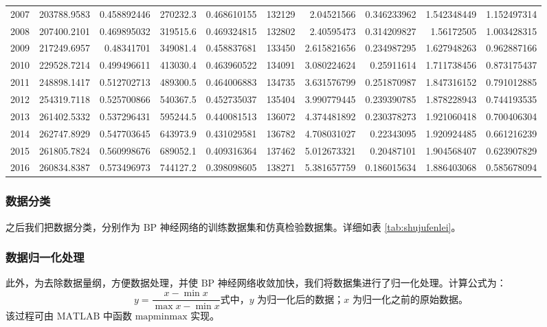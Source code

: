 \begin{table}[hb]
{\begin{tabular}{rrrrrrrrrr}
        2007 & 203788.9583 & 0.458892446 & 270232.3 & 0.468610155 & 132129 & 2.04521566 & 0.346233962 & 1.542348449 & 1.152497314 \\
        2008 & 207400.2101 & 0.469895032 & 319515.6 & 0.469324815 & 132802 & 2.40595473 & 0.314209827 & 1.56172505 & 1.003428315 \\
        2009 & 217249.6957 & 0.48341701 & 349081.4 & 0.458837681 & 133450 & 2.615821656 & 0.234987295 & 1.627948263 & 0.962887166 \\
        2010 & 229528.7214 & 0.499496611 & 413030.4 & 0.463960522 & 134091 & 3.080224624 & 0.25911614 & 1.711738456 & 0.873175437 \\
        2011 & 248898.1417 & 0.512702713 & 489300.5 & 0.464006883 & 134735 & 3.631576799 & 0.251870987 & 1.847316152 & 0.791012885 \\
        2012 & 254319.7118 & 0.525700866 & 540367.5 & 0.452735037 & 135404 & 3.990779445 & 0.239390785 & 1.878228943 & 0.744193535 \\
        2013 & 261402.5332 & 0.537296431 & 595244.5 & 0.440081513 & 136072 & 4.374481892 & 0.230378273 & 1.921060418 & 0.700406304 \\
        2014 & 262747.8929 & 0.547703645 & 643973.9 & 0.431029581 & 136782 & 4.708031027 & 0.22343095 & 1.920924485 & 0.661216239 \\
        2015 & 261805.7824 & 0.560998676 & 689052.1 & 0.409316364 & 137462 & 5.012673321 & 0.20487101 & 1.904568407 & 0.623907829 \\
        2016 & 260834.8387 & 0.573496973 & 744127.2 & 0.398098605 & 138271 & 5.381657759 & 0.186015634 & 1.886403068 & 0.585678094 \\
        \bottomrule[1.5pt]
        \end{tabular}}%
      \label{tab:jutizhi}%
    \end{table}%

  \subsubsection{数据分类}

    之后我们把数据分类，分别作为 $\mathrm{BP}$ 神经网络的训练数据集和仿真检验数据集。详细如表 \ref{tab:shujufenlei}。

  \subsubsection{数据归一化处理}

    \label{ss2:guiyihua}
    此外，为去除数据量纲，方便数据处理，并使 $\mathrm{BP}$ 神经网络收敛加快，我们将数据集进行了归一化处理\cite{liuzhongqi2010}。计算公式为：
    \[
      y = \frac{x-\min{x}}{\max{x}-\min{x}} \text{式中，$y$ 为归一化后的数据；$x$ 为归一化之前的原始数据。}
    \]
    该过程可由 $\mathrm{MATLAB}$ 中函数 $\mathrm{mapminmax}$ 实现。


